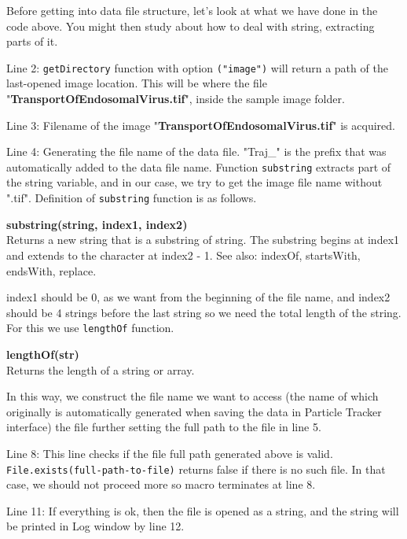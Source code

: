 \documentclass[11pt,a4paper,oneside]{report}
\newenvironment{indentCom}%
{\begin{list}{}%
         {\setlength{\leftmargin}{1em}}%
         \item[]%
}
{\end{list}}
\newcommand{\ilcom}[1]{\texttt{\small#1}}
\begin{document}
Before getting into data file structure, let's look at what we have done in the code above. 
You might then study about how to deal with string, extracting parts of it. 
\begin{itemize}
\item Line 2: \ilcom{getDirectory} function with option \ilcom{("image")} 
will return a path of the last-opened image location. 
This will be where the file "\textbf{TransportOfEndosomalVirus.tif}", inside the sample image folder. 
\item Line 3: Filename of the image  "\textbf{TransportOfEndosomalVirus.tif}" is acquired. 
\item Line 4: Generating the file name of the data file. "Traj\_" is the prefix that was automatically added to 
the data file name. Function \ilcom{substring} extracts part of the string variable, and in our case, 
we try to get the image file name without ".tif". Definition of \ilcom{substring} function is as follows.

\begin{indentCom}
\textbf{substring(string, index1, index2)}\\
Returns a new string that is a substring of string. The substring begins at index1 and extends to the character at index2 - 1. 
See also: indexOf, startsWith, endsWith, replace.
\end{indentCom}

index1 should be 0, as we want from the beginning of the file name, and index2 should be 4 strings before the 
last string so we need the total length of the string. For this we use \ilcom{lengthOf} function. 
\begin{indentCom}
\textbf{lengthOf(str)}\\
Returns the length of a string or array.
\end{indentCom}
In this way, we construct the file name we want to access 
(the name of which originally is automatically generated when saving the data in Particle Tracker interface) 
the file further setting the full path to the file in line 5. 
\item Line 8: This line checks if the file full path generated above is valid. 
\ilcom{File.exists(full-path-to-file)} returns false if there is no such file. In that case, we should not proceed more so macro terminates at line 8. 
\item Line 11: If everything is ok, then the file is opened as a string, 
and the string will be printed in Log window by line 12. 
\end{itemize}
\end{document}
